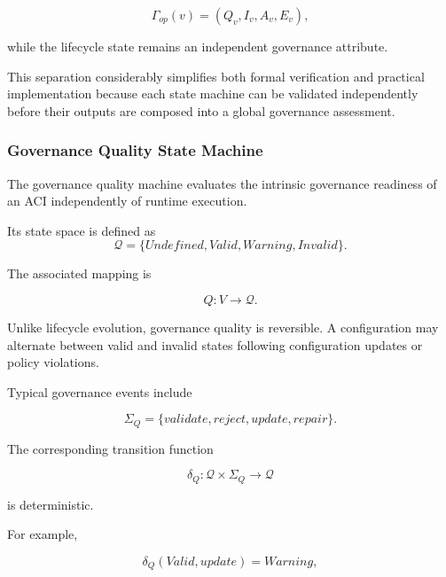 \documentclass[10pt]{article}
\begin{document}
\begin{equation}
\Gamma_{op}(v)
=
(
Q_v,
I_v,
A_v,
E_v
),
\label{eq:complete_operation_aci}
\end{equation}

while the lifecycle state remains an independent governance attribute.

This separation considerably simplifies both formal verification and practical
implementation because each state machine can be validated independently before
their outputs are composed into a global governance assessment.

\subsubsection{Governance Quality State Machine}

The governance quality machine evaluates the intrinsic governance readiness of
an ACI independently of runtime execution.

Its state space is defined as
\begin{equation}
\mathcal{Q}
=
\{
Undefined,
Valid,
Warning,
Invalid
\}.
\end{equation} 

The associated mapping is

\[
Q:V\rightarrow\mathcal{Q}.
\]

Unlike lifecycle evolution, governance quality is reversible.
A configuration may alternate between valid and invalid states following
configuration updates or policy violations.

Typical governance events include

\begin{equation}
\Sigma_Q
=
\{
validate,
reject,
update,
repair
\}.
\label{eq:quality_state}
\end{equation}

The corresponding transition function

\begin{equation}
\delta_Q
:
\mathcal{Q}
\times
\Sigma_Q
\rightarrow
\mathcal{Q}
\label{eq:transition_function_quality}
\end{equation}

is deterministic.

For example,

\begin{equation}
\delta_Q
(
Valid,
update
)
=
Warning,
\label{eq:valid_to_warning}
\end{equation}
\end{document}
